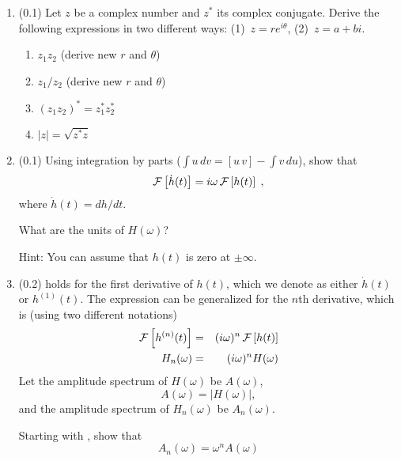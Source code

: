 \documentclass[11pt,titlepage,fleqn]{article}
\newcommand{\fft}{h}
\newcommand{\ffw}{H}
\begin{document}
\begin{enumerate}

\item (0.1) Let $z$ be a complex number and $z^*$ its complex conjugate. Derive the following expressions in two different ways: (1)~$z = r e^{i\theta}$, (2)~$z = a+bi$.
%
\begin{enumerate}
\item $z_1 z_2$ (derive new $r$ and $\theta$)
\item $z_1 / z_2$ (derive new $r$ and $\theta$)
\item $(z_1 z_2)^* = z_1^* z_2^*$
\item $|z| = \sqrt{z^* z}$
\end{enumerate}


\item (0.1) Using integration by parts ($\int u\,dv = [u\,v] - \int v\,du$), show that 
%
\begin{eqnarray}
\cF \left[ \dot{\fft}(t) \right] = i\omega \, \cF \left[ \fft(t) \right]
\label{fftder1}
\;,
\end{eqnarray}
%
where $\dot{\fft}(t) = d\fft/dt$.

What are the units of $\ffw(\omega)$?

Hint: You can assume that $h(t)$ is zero at $\pm\infty$.


\item (0.2)  holds for the first derivative of $\fft(t)$, which we denote as either $\dot{\fft}(t)$ or $\fft^{(1)}(t)$. The expression can be generalized for the $n$th derivative, which is (using two different notations)
%
\begin{eqnarray}
\cF \left[ \fft^{(n)}(t) \right] &=& (i\omega)^n \, \cF \left[ \fft(t) \right]
\\
\ffw_n(\omega) &=& (i\omega)^n \ffw(\omega)
\label{fftnder}
\end{eqnarray}
%
Let the amplitude spectrum of $\ffw(\omega)$ be $A(\omega)$,
%
\begin{equation}
A(\omega) = |\ffw(\omega)|,
\end{equation}
%
and the amplitude spectrum of $\ffw_n(\omega)$ be $A_n(\omega)$.

Starting with , show that
%
\begin{equation}
A_n(\omega) = \omega^n A(\omega)
\end{equation}



\end{enumerate}
\end{document}
